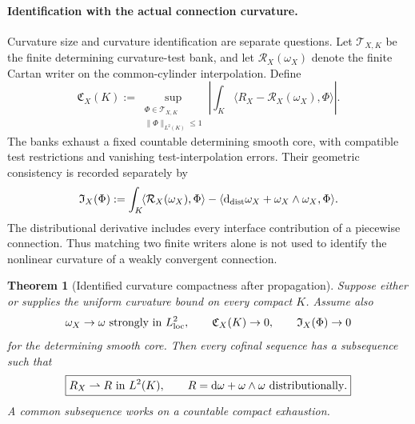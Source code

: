 \documentclass[11pt]{article}
\newtheorem{theorem}{Theorem}[section]
\theoremstyle{definition}
\theoremstyle{remark}
\newcommand{\dd}{\mathrm d}
\begin{document}
\paragraph{Identification with the actual connection curvature.}
Curvature size and curvature identification are separate questions.  Let
$\mathcal T_{X,K}$ be the finite determining curvature-test bank, and let
$\mathcal R_X(\omega_X)$ denote the finite Cartan writer on the common-cylinder
interpolation.  Define
\begin{equation}
 \boxed{\mathfrak C_X(K):=
 \sup_{\substack{\Phi\in\mathcal T_{X,K}\\\|\Phi\|_{L^2(K)}\le1}}
 \left|\int_K\!\langle R_X-\mathcal R_X(\omega_X),\Phi\rangle\right|.}
 \label{eq:main-cartan-curvature-residual}
\end{equation}
The banks exhaust a fixed countable determining smooth core, with compatible
test restrictions and vanishing test-interpolation errors.  Their geometric
consistency is recorded separately by
\begin{equation}
 \mathfrak I_X(\Phi):=
 \int_K\!\langle\mathcal R_X(\omega_X),\Phi\rangle
 -\langle\dd_{\rm dist}\omega_X+\omega_X\wedge\omega_X,\Phi\rangle.
 \label{eq:main-cartan-incidence}
\end{equation}
The distributional derivative includes every interface contribution of a
piecewise connection.  Thus matching two finite writers alone is not used to
identify the nonlinear curvature of a weakly convergent connection.

\begin{theorem}[Identified curvature compactness after propagation]
\label{thm:main-curvature-compactness}
Suppose either  or
 supplies the uniform curvature bound on
every compact $K$.  Assume also
\begin{equation}
 \omega_X\to\omega\ \hbox{strongly in }L^2_{\rm loc},\qquad
 \mathfrak C_X(K)\to0,\qquad
 \mathfrak I_X(\Phi)\to0
 \label{eq:main-identified-curvature-hypotheses}
\end{equation}
for the determining smooth core.  Then every cofinal sequence has a subsequence
such that
\begin{equation}
 \boxed{R_X\rightharpoonup R\ \hbox{in }L^2(K),\qquad
 R=\dd\omega+\omega\wedge\omega\ \hbox{distributionally}.}
 \label{eq:main-curvature-weak}
\end{equation}
A common subsequence works on a countable compact exhaustion.
\end{theorem}
\end{document}
